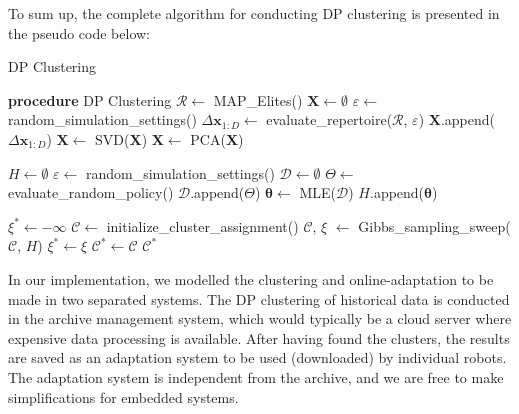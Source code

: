 To sum up, the complete algorithm for conducting DP clustering is presented in the pseudo code below:
\begin{algorithm}
\caption{DP Clustering}
\begin{algorithmic}
\STATE \textbf{procedure} DP Clustering
\STATE $\mathcal{R} \leftarrow $ MAP{\_}Elites() 
\STATE $\bm{X} \leftarrow \emptyset$ 
\STATE $\varepsilon \leftarrow$ random{\_}simulation{\_}settings()
\STATE $\Delta \bm{x}_{1:D} \leftarrow $ evaluate{\_}repertoire($\mathcal{R}$, $\varepsilon$)
\STATE $\bm{X}$.append($\Delta \bm{x}_{1:D}$)
\ENDFOR
\STATE $\bm{X} \leftarrow$ SVD($\bm{X}$) 
\STATE $\bm{X} \leftarrow$ PCA($\bm{X}$) 
\STATE 

\STATE $H \leftarrow \emptyset$ 
\STATE $\varepsilon\leftarrow$ random{\_}simulation{\_}settings()
\STATE $\mathcal{D} \leftarrow \emptyset$ 
\STATE $\Theta \leftarrow$ evaluate{\_}random{\_}policy()
\STATE $\mathcal{D}$.append($\Theta$)
\ENDFOR
\STATE $\bm{\theta} \leftarrow$ MLE($\mathcal{D}$) 
\STATE $H$.append($\bm{\theta}$)
\ENDFOR
\STATE {}


\STATE $\xi^{*} \leftarrow -\infty$ 
\STATE $\mathcal{C} \leftarrow$ initialize{\_}cluster{\_}assignment() 
\STATE $\mathcal{C}$, $\xi$ $\leftarrow$ Gibbs{\_}sampling{\_}sweep($\mathcal{C}$, $H$)
\IF{$\xi > \xi^{*}$}
\STATE $\xi^{*} \leftarrow \xi$
\STATE $\mathcal{C}^{*} \leftarrow \mathcal{C}$ 
\ENDIF
\ENDFOR
\RETURN $\mathcal{C}^{*}$ 
\end{algorithmic}
\label{DP_clustering}
\end{algorithm}
In our implementation, we modelled the clustering and online-adaptation to be made in two separated systems.
The DP clustering of historical data is conducted in the archive management system, which would typically be a cloud server where expensive data processing is available.
After having found the clusters, the results are saved as an adaptation system to be used (downloaded) by individual robots.
The adaptation system is independent from the archive, and we are free to make simplifications for embedded systems.





